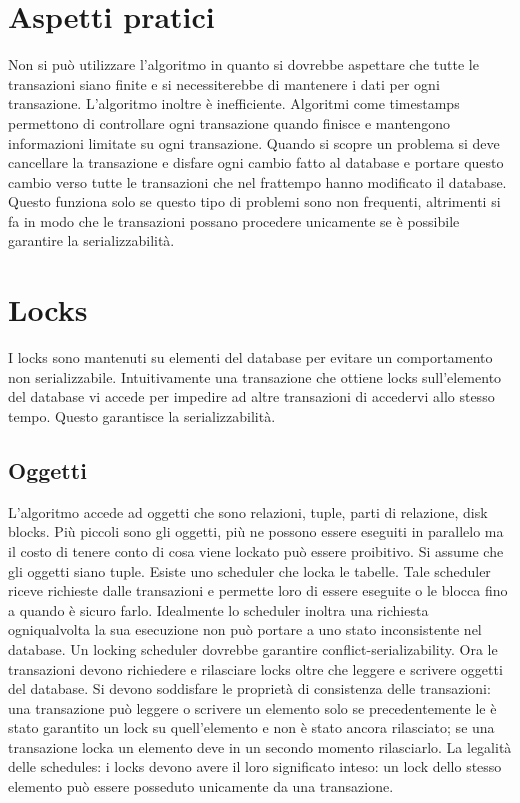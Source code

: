 \section{Aspetti pratici}
Non si pu\`o utilizzare l'algoritmo in quanto si dovrebbe aspettare che tutte le transazioni siano finite e si necessiterebbe di mantenere i dati per ogni transazione. L'algoritmo inoltre \`e inefficiente. Algoritmi
come timestamps permettono di controllare ogni transazione quando finisce e mantengono informazioni limitate su ogni transazione. Quando si scopre un problema si deve cancellare la transazione e disfare
ogni cambio fatto al database e portare questo cambio verso tutte le transazioni che nel frattempo hanno modificato il database. Questo funziona solo se questo tipo di problemi sono non frequenti, altrimenti
si fa in modo che le transazioni possano procedere unicamente se \`e possibile garantire la serializzabilit\`a. 
\section{Locks}
I locks sono mantenuti su elementi del database per evitare un comportamento non serializzabile. Intuitivamente una transazione che ottiene locks sull'elemento del database vi accede per impedire ad altre 
transazioni di accedervi allo stesso tempo. Questo garantisce la serializzabilit\`a. 
\subsection{Oggetti}
L'algoritmo accede ad oggetti che sono relazioni, tuple, parti di relazione, disk blocks. Pi\`u piccoli sono gli oggetti, pi\`u ne possono essere eseguiti in parallelo ma il costo di tenere conto di cosa viene lockato
pu\`o essere proibitivo. Si assume che gli oggetti siano tuple. Esiste uno scheduler che locka le tabelle. Tale scheduler riceve richieste dalle transazioni e permette loro di essere eseguite o le blocca fino a quando
\`e sicuro farlo. Idealmente lo scheduler inoltra una richiesta ogniqualvolta la sua esecuzione non pu\`o portare a uno stato inconsistente nel database. Un locking scheduler dovrebbe garantire conflict-serializability.
Ora le transazioni devono richiedere e rilasciare locks oltre che leggere e scrivere oggetti del database. Si devono soddisfare le propriet\`a di consistenza delle transazioni: una transazione pu\`o leggere o scrivere 
un elemento solo se precedentemente le \`e stato garantito un lock su quell'elemento e non \`e stato ancora rilasciato; se una transazione locka un elemento deve in un secondo momento rilasciarlo. 
La legalit\`a delle schedules: i locks devono avere il loro significato inteso: un lock dello stesso elemento pu\`o essere posseduto unicamente da una transazione. 
